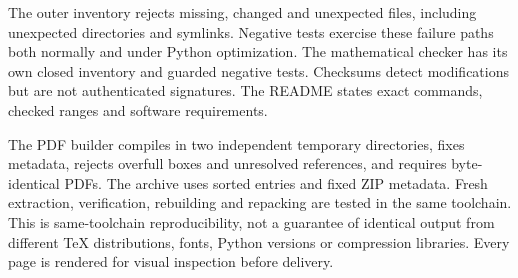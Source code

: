 \documentclass[11pt,letterpaper]{article}
\theoremstyle{remark}\newtheorem{remark}[theorem]{Remark}
\begin{document}
The outer inventory rejects missing, changed and unexpected files,
including unexpected directories and symlinks. Negative tests exercise
these failure paths both normally and under Python optimization.
The mathematical checker has its own closed inventory and guarded
negative tests. Checksums detect modifications but are not authenticated
signatures. The README states exact commands, checked ranges and
software requirements.

The PDF builder compiles in two independent temporary directories,
fixes metadata, rejects overfull boxes and unresolved references,
and requires byte-identical PDFs. The archive uses sorted entries
and fixed ZIP metadata. Fresh extraction, verification, rebuilding
and repacking are tested in the same toolchain. This is same-toolchain
reproducibility, not a guarantee of identical output from different
TeX distributions, fonts, Python versions or compression libraries.
Every page is rendered for visual inspection before delivery.
\clearpage
\end{document}
